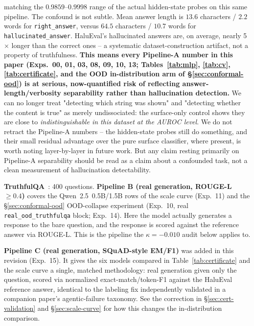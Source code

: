 \documentclass[10pt,twocolumn]{article}
\begin{document}
matching the $0.9859$--$0.9998$ range of the actual hidden-state probes
on this same pipeline. The confound is not subtle. Mean answer length is
$13.6$ characters / $2.2$ words for \texttt{right\_answer}, versus
$64.5$ characters / $10.7$ words for \texttt{hallucinated\_answer}.
HaluEval's hallucinated answers are, on average, nearly 5$\times$ longer
than the correct ones -- a systematic dataset-construction artifact, not
a property of truthfulness. \textbf{This means every Pipeline-A number
in this paper (Exps.~00, 01, 03, 08, 09, 10, 13; Tables~\ref{tab:mlp},
\ref{tab:cv}, \ref{tab:certificate}, and the OOD in-distribution arm of
\S\ref{sec:conformal-ood}) is at serious, now-quantified risk of
reflecting answer-length/verbosity separability rather than
hallucination detection.} We can no longer treat "detecting which
string was shown" and "detecting whether the content is true" as merely
undissociated: the surface-only control shows they are close to
\emph{indistinguishable in this dataset at the AUROC level}. We do not
retract the Pipeline-A numbers -- the hidden-state probes still do
something, and their small residual advantage over the pure surface
classifier, where present, is worth noting layer-by-layer in future
work. But any claim resting primarily on Pipeline-A separability should
be read as a claim about a confounded task, not a clean measurement of
hallucination detectability.

\noindent\textbf{TruthfulQA}~\citep{lin2022truthfulqa}: 400 questions.
\textbf{Pipeline B (real generation, ROUGE-L $\geq 0.4$)} covers the
Qwen~2.5~0.5B/1.5B rows of the scale curve (Exp.~11) and the
\S\ref{sec:conformal-ood} OOD-collapse experiment (Exp.~10, real
\texttt{real\_ood\_truthfulqa} block; Exp.~14). Here the model actually
generates a response to the bare question, and the response is scored
against the reference answer via ROUGE-L. This is the pipeline the
$\kappa = -0.010$ audit below applies to.

\textbf{Pipeline C (real generation, SQuAD-style EM/F1)} was added in
this revision (Exp.~15). It gives the six models compared in
Table~\ref{tab:certificate} and the scale curve a single, matched
methodology: real generation given only the question, scored via
normalized exact-match/token-F1 against the HaluEval reference answer,
identical to the labeling fix independently validated in a companion
paper's agentic-failure taxonomy. See the correction in
\S\ref{sec:cert-validation} and \S\ref{sec:scale-curve} for how this
changes the in-distribution comparison.
\end{document}
